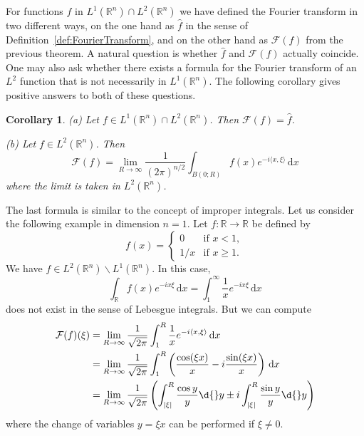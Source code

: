 \documentclass[12pt, oneside, a4paper]{article}
\newtheorem{cor}[thm]{Corollary}
\theoremstyle{dfn}
\newcommand{\scalprod}[2]{\langle #1,#2 \rangle}
\def\Rbb{\ensuremath{\mathbb{R}}}
\def\dx{\,\mathrm dx}
\newcommand{\Fcal}{\mathcal{F}}
\providecommand{\abs}[1]{\lvert#1\rvert}
\begin{document}
For functions $f$ in $L^1(\Rbb^n) \cap L^2(\Rbb^n)$ we have defined the Fourier transform in two different ways, on the one hand as $\widehat{f}$ in the sense of Definition~\ref{def:FourierTransform}, and on the other hand as $\Fcal(f)$ from the previous theorem. A natural question is whether $\widehat{f}$ and $\Fcal(f)$ actually coincide. One may also ask whether there exists a formula for the Fourier transform of an $L^2$ function that is not necessarily in $L^1(\Rbb^n)$. The following corollary gives positive answers to both of these questions.

\begin{cor}
(a) Let $f \in L^1(\Rbb^n) \cap L^2(\Rbb^n)$. Then $\Fcal(f) = \widehat{f}$.

(b) Let $f \in L^2(\Rbb^n)$. Then
\[
\Fcal(f) = \lim_{R \to \infty} \frac{1}{(2\pi)^{n/2}} \int_{B(0;R)} f(x) e^{-i\scalprod{x}{\xi}} \dx
\]
where the limit is taken in $L^2(\Rbb^n)$.
\end{cor}

The last formula is similar to the concept of improper integrals.
Let us consider the following example in dimension $n = 1$. Let $f \colon \Rbb \to \Rbb$ be defined by
\[
f(x) =
\begin{cases}
0 & \text{if } x < 1, \\
1/x & \text{if } x \geqslant 1.
\end{cases}
\]
We have $f \in L^2(\Rbb^n) \smallsetminus L^1(\Rbb^n)$. In this case,
\[
\int_\Rbb f(x) e^{-ix\xi} \dx = \int_1^\infty \frac{1}{x} e^{-ix\xi} \dx
\]
does not exist in the sense of Lebesgue integrals. But we can compute
\begin{align*}
	\Fcal(f)(\xi)
	&= \lim_{R \to \infty} \frac{1}{\sqrt{2\pi}} \int_1^R \frac{1}{x} e^{-i\scalprod{x}{\xi}} \dx \\
	&= \lim_{R \to \infty} \frac{1}{\sqrt{2\pi}} \int_1^R \left( \frac{\cos(\xi x)}{x} -i \frac{\sin(\xi x)}{x} \right) \dx \\
	&= \lim_{R \to \infty} \frac{1}{\sqrt{2\pi}} \left( \int_{\abs{\xi}}^R \frac{\cos y}{y} \d{}y \pm i \int_{\abs{\xi}}^R \frac{\sin y}{y} \d{}y \right)
\end{align*}
where the change of variables $y = \xi x$ can be performed if $\xi \neq 0$.
\end{document}
